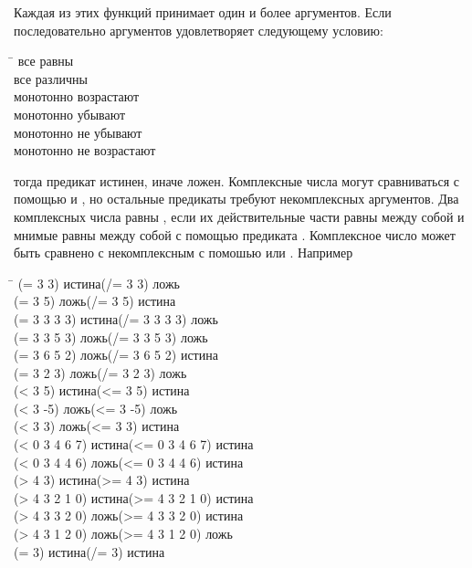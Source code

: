 \begin{defun}[Function]
Каждая из этих функций принимает один и более аргументов. Если последовательно
аргументов удовлетворяет следующему условию:
\begin{tabbing}
\hskip 5pc\=\kill
\cdf{=}\>все равны \\
\cdf{/=}\>все различны \\
\cdf{<}\>монотонно возрастают \\
\cdf{>}\>монотонно убывают \\
\cdf{<=}\>монотонно не убывают \\
\cdf{>=}\>монотонно не возрастают
\end{tabbing}
тогда предикат истинен, иначе ложен.
Комплексные числа могут сравниваться с помощью \cdf{=} и \cdf{/=}, но остальные
предикаты требуют некомплексных аргументов.
Два комплексных числа равны \cdf{=}, если их действительные части равны между
собой и мнимые равны между собой с помощью предиката \cdf{=}.
Комплексное число может быть сравнено с некомплексным с помошью \cdf{=} или
\cdf{/=}.
Например
\begin{lisp}
\textwidth\=\kill
(= 3 3) \textrm{истина}\>(/= 3 3) \textrm{ложь} \\
(= 3 5) \textrm{ложь}\>(/= 3 5) \textrm{истина} \\
(= 3 3 3 3) \textrm{истина}\>(/= 3 3 3 3) \textrm{ложь} \\
(= 3 3 5 3) \textrm{ложь}\>(/= 3 3 5 3) \textrm{ложь} \\
(= 3 6 5 2) \textrm{ложь}\>(/= 3 6 5 2) \textrm{истина} \\
(= 3 2 3) \textrm{ложь}\>(/= 3 2 3) \textrm{ложь} \\
(< 3 5) \textrm{истина}\>(<= 3 5) \textrm{истина} \\
(< 3 -5) \textrm{ложь}\>(<= 3 -5) \textrm{ложь} \\
(< 3 3) \textrm{ложь}\>(<= 3 3) \textrm{истина} \\
(< 0 3 4 6 7) \textrm{истина}\>(<= 0 3 4 6 7) \textrm{истина} \\
(< 0 3 4 4 6) \textrm{ложь}\>(<= 0 3 4 4 6) \textrm{истина} \\
(> 4 3) \textrm{истина}\>(>= 4 3) \textrm{истина} \\
(> 4 3 2 1 0) \textrm{истина}\>(>= 4 3 2 1 0) \textrm{истина} \\
(> 4 3 3 2 0) \textrm{ложь}\>(>= 4 3 3 2 0) \textrm{истина} \\
(> 4 3 1 2 0) \textrm{ложь}\>(>= 4 3 1 2 0) \textrm{ложь} \\
(= 3) \textrm{истина}\>(/= 3) \textrm{истина} \\

\end{lisp}
\end{defun}
